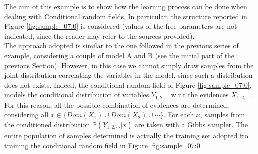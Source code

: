 The aim of this example is to show how the learning process can be done when dealing with Conditional random fields. In particular, the structure  reported in Figure \ref{fig:sample_07:0} is considered (values of the free parameters are not indicated, since the reader may refer to the sources provided).
\\
The approach adopted is similar to the one followed in the previous series of example, considering a couple of model A and B (see the initial part of the previous Section). However, in this case we cannot simply draw samples from the joint distribution correlating the variables in the model, since such a distribution does not exists. Indeed, the conditional random field of Figure \ref{fig:sample_07:0}, models the conditional distribution of variables $Y_{1,2,\cdots}$ w.r.t the evidences $X_{1,2,\cdots}$. For this reason, all the possible combination of evidences are determined, considering all $x \in \lbrace Dom(X_1) \cup Dom(X_2) \cup \cdots \rbrace$. For each $x$, samples from the conditioned distribution $\mathbb{P}(Y_{1,2,\cdots} | x)$ are taken with a Gibbs sampler. The entire population of samples determined is actually the training set adopted fro training the conditional random field in Figure \ref{fig:sample_07:0}.
 
